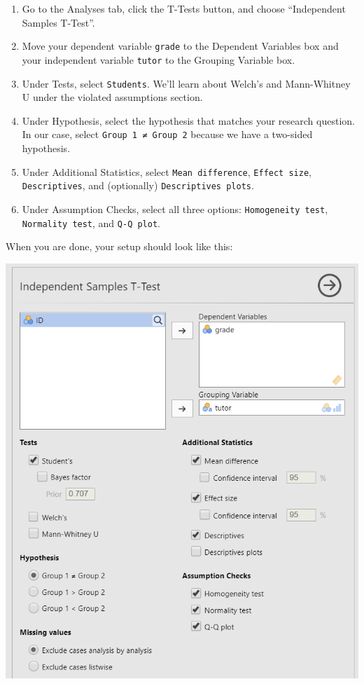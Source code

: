 \documentclass[
]{book}
\begin{document}
\begin{enumerate}
\def\labelenumi{\arabic{enumi}.}
\item
  Go to the Analyses tab, click the T-Tests button, and choose ``Independent Samples T-Test''.
\item
  Move your dependent variable \texttt{grade} to the Dependent Variables box and your independent variable \texttt{tutor} to the Grouping Variable box.
\item
  Under Tests, select \texttt{Student\textquotesingle{}s}. We'll learn about Welch's and Mann-Whitney U under the violated assumptions section.
\item
  Under Hypothesis, select the hypothesis that matches your research question. In our case, select \texttt{Group\ 1\ ≠\ Group\ 2} because we have a two-sided hypothesis.
\item
  Under Additional Statistics, select \texttt{Mean\ difference}, \texttt{Effect\ size}, \texttt{Descriptives}, and (optionally) \texttt{Descriptives\ plots}.
\item
  Under Assumption Checks, select all three options: \texttt{Homogeneity\ test}, \texttt{Normality\ test}, and \texttt{Q-Q\ plot}.
\end{enumerate}

When you are done, your setup should look like this:

\includegraphics{images/02-independent_t-test/independent_t-test_setup.png}
\end{document}
